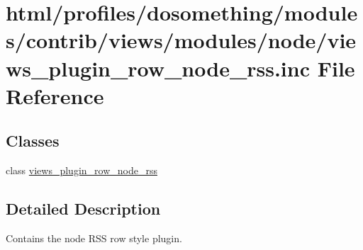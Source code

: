\hypertarget{views__plugin__row__node__rss_8inc}{
\section{html/profiles/dosomething/modules/contrib/views/modules/node/views\_\-plugin\_\-row\_\-node\_\-rss.inc File Reference}
\label{views__plugin__row__node__rss_8inc}
}
\subsection*{Classes}
\begin{DoxyCompactItemize}
\item 
class \hyperlink{classviews__plugin__row__node__rss}{views\_\-plugin\_\-row\_\-node\_\-rss}
\end{DoxyCompactItemize}


\subsection{Detailed Description}
Contains the node RSS row style plugin. 